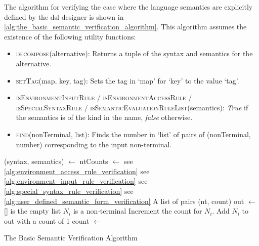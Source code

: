The algorithm for verifying the case where the language semantics are explicitly defined by the \gls{dsl} designer is shown in \autoref{alg:the_basic_semantic_verification_algorithm}.
This algorithm assumes the existence of the following utility functions:
\begin{itemize}
    \item \textsc{decompose}(alternative): Returns a tuple of the syntax and semantics for the alternative.
    \item \textsc{setTag}(map, key, tag): Sets the tag in `map' for `key' to the value `tag'. 
    \item \textsc{isEnvironmentInputRule} / \textsc{isEnvironmentAccessRule} / \textsc{isSpecialSyntaxRule} / \textsc{isSemanticEvaluationRuleList}(semantics): \textit{True} if the semantics is of the kind in the name, \textit{false} otherwise.
    \item \textsc{find}(nonTerminal, list): Finds the number in `list' of pairs of (nonTerminal, number) corresponding to the input non-terminal.
\end{itemize}

\begin{algorithm}
\begin{algorithmic}
    \State (syntax, semantics) $\gets$ 
    \State ntCounts $\gets$ 
        \State {}
    \EndFor
    \State
        \State {}
        \Comment see \autoref{alg:environment_access_rule_verification}
        \State {}
        \Comment see \autoref{alg:environment_input_rule_verification}
        \State {}
        \Comment see \autoref{alg:special_syntax_rule_verification}
        \State {}
        \Comment see \autoref{alg:user_defined_semantic_form_verification}
    \EndIf
\EndFunction
\State
{}
\Comment A list of pairs (nt, count)
    \State out $\gets$ []
    \Comment [] is the empty list
        \Comment $N_i$ is a non-terminal
            \State Increment the count for $N_i$.
        \Else
            \State Add $N_i$ to out with a count of 1
        \EndIf
    \EndFor
    \State {}
\EndFunction
\State
{}
    \State count $\gets$ 
        \State {}
    \Else
        \State {}
    \EndIf
\EndFunction
\end{algorithmic}
\caption{The Basic Semantic Verification Algorithm}
\label{alg:the_basic_semantic_verification_algorithm}
\end{algorithm}

